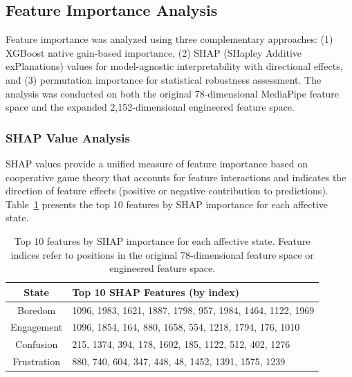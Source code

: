 \subsection{Feature Importance Analysis}
\label{sec:feature-importance}

Feature importance was analyzed using three complementary approaches: (1) XGBoost native gain-based importance, (2) SHAP (SHapley Additive exPlanations) values for model-agnostic interpretability with directional effects, and (3) permutation importance for statistical robustness assessment. The analysis was conducted on both the original 78-dimensional MediaPipe feature space and the expanded 2,152-dimensional engineered feature space.

\subsubsection{SHAP Value Analysis}
\label{sec:shap-analysis}

SHAP values provide a unified measure of feature importance based on cooperative game theory that accounts for feature interactions and indicates the direction of feature effects (positive or negative contribution to predictions). Table~\ref{tab:shap-top-features} presents the top 10 features by SHAP importance for each affective state.

\begin{table}[t]
\centering
\caption{Top 10 features by SHAP importance for each affective state. Feature indices refer to positions in the original 78-dimensional feature space or engineered feature space.}
\label{tab:shap-top-features}
\begin{tabular}{cl}
\toprule
\textbf{State} & \textbf{Top 10 SHAP Features (by index)} \\
\midrule
Boredom & 1096, 1983, 1621, 1887, 1798, 957, 1984, 1464, 1122, 1969 \\
Engagement & 1096, 1854, 164, 880, 1658, 554, 1218, 1794, 176, 1010 \\
Confusion & 215, 1374, 394, 178, 1602, 185, 1122, 512, 402, 1276 \\
Frustration & 880, 740, 604, 347, 448, 48, 1452, 1391, 1575, 1239 \\
\bottomrule
\end{tabular}
\end{table}

